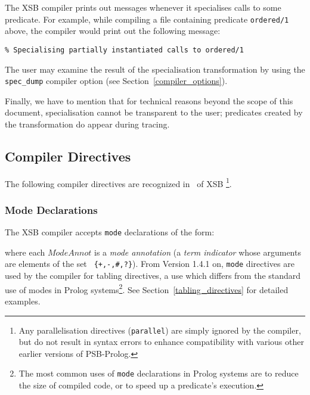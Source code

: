 The XSB compiler prints out messages whenever it specialises
calls to some predicate.  For example, while compiling a file
containing predicate {\tt ordered/1} above, the compiler would print
out the following message:
\begin{center}
{\tt	\% Specialising partially instantiated calls to ordered/1}
\end{center}
The user may examine the result of the specialisation transformation
by using the {\tt spec\_dump} compiler option
(see Section~\ref{compiler_options}).

Finally, we have to mention that for technical reasons beyond the scope of
this document, specialisation cannot be transparent to the user; predicates
created by the transformation do appear during tracing.


\subsection{Compiler Directives}\label{compiler_directives}

The following compiler directives are recognized in \version\ of XSB
\footnote{Any parallelisation directives ({\tt parallel}) are simply
ignored by the compiler, but do not result in syntax errors to enhance
compatibility with various other earlier versions of PSB-Prolog.}.

\subsubsection{Mode Declarations}\label{mode_declarations}

The XSB compiler accepts {\tt mode} declarations of the form:


\noindent
where each $ModeAnnot$ is a {\em mode annotation\/} (a {\em term
indicator\/} whose arguments are elements of the set {\tt
\{+,-,\#,?\}}).  From Version 1.4.1 on, {\tt mode} directives are used
by the compiler for tabling directives, a use which differs from the
standard use of modes in Prolog systems\footnote{The most common uses
of {\tt mode} declarations in Prolog systems are to reduce the size of
compiled code, or to speed up a predicate's execution.}.  See
Section~\ref{tabling_directives} for detailed examples.

